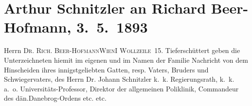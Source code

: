 

         
         \renewcommand{\erwaehntePersonen}{Personen: Richard Beer-Hofmann, Gisela Hajek, Markus Hajek, Johann Schnitzler, Louise Schnitzler, Julius Schnitzler, Johanna Willheim}
         \renewcommand{\erwaehnteInstitutionen}{Institutionen: Allgemeine Poliklinik, Dannebrogorden, M. Engel und Söhne}
         \renewcommand{\erwaehnteOrte}{Orte: Burgring, Dänemark, Lichtenfelsgasse, Wien, Wiener Zentralfriedhof, Wollzeile}
         \renewcommand{\erwaehnteWerke}{}
               \section[Arthur Schnitzler an Richard Beer-Hofmann, 3. 5. 1893]{ Arthur Schnitzler an Richard Beer-Hofmann, 3. 5. 1893}\nopagebreak{}\rehead{ }\begin{ledgroupsized}[t]{13cm}\normalsize\beginnumbering \toendnotes[C]{\smallbreak\pagebreak[2]} 
\pstart{}{\pb}Herrn \textsc{Dr. Rich.
                     Beer-Hofmann}\pend{}\pstart{}\textsc{Wien}\pend{}\pstart{}\textsc{I Wollzeile 15}.\pend{}{\bigskip}\pstart
           \noindent{}{\pb}Tieferschüttert geben die Unterzeichneten hiemit im
               eigenen und im Namen der Familie Nachricht von dem Hinscheiden ihres innigstgeliebten
               Gatten, resp. Vaters, Bruders und Schwiegervaters, des Herrn\pend
           \pstart
           \centering{}Dr. Johann Schnitzler\pend
           \pstart
           \noindent{}\centering{}k. k. Regierungsrath, k. k. a. o. Universitäts-Professor, Direktor der
                  allgemeinen Poliklinik, Commandeur des dän.Danebrog-Ordens etc. etc.\pend

\end{ledgroupsized}
